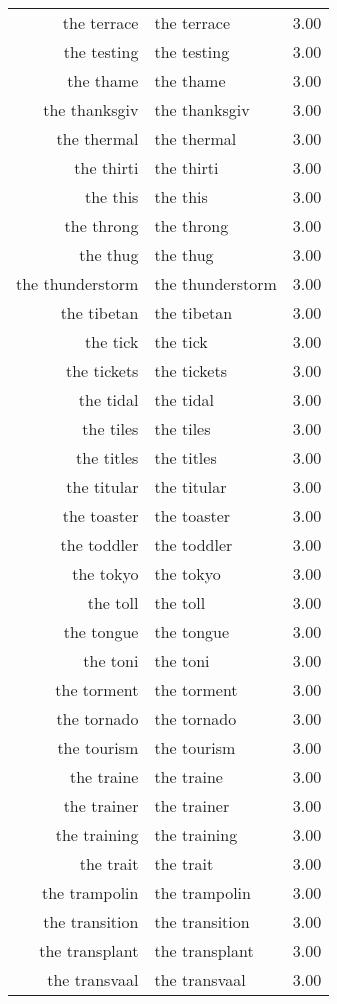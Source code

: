 \begin{table}[ht]
\begin{tabular}{rlr}
  the terrace & the terrace & 3.00 \\ 
  the testing & the testing & 3.00 \\ 
  the thame & the thame & 3.00 \\ 
  the thanksgiv & the thanksgiv & 3.00 \\ 
  the thermal & the thermal & 3.00 \\ 
  the thirti & the thirti & 3.00 \\ 
  the this & the this & 3.00 \\ 
  the throng & the throng & 3.00 \\ 
  the thug & the thug & 3.00 \\ 
  the thunderstorm & the thunderstorm & 3.00 \\ 
  the tibetan & the tibetan & 3.00 \\ 
  the tick & the tick & 3.00 \\ 
  the tickets & the tickets & 3.00 \\ 
  the tidal & the tidal & 3.00 \\ 
  the tiles & the tiles & 3.00 \\ 
  the titles & the titles & 3.00 \\ 
  the titular & the titular & 3.00 \\ 
  the toaster & the toaster & 3.00 \\ 
  the toddler & the toddler & 3.00 \\ 
  the tokyo & the tokyo & 3.00 \\ 
  the toll & the toll & 3.00 \\ 
  the tongue & the tongue & 3.00 \\ 
  the toni & the toni & 3.00 \\ 
  the torment & the torment & 3.00 \\ 
  the tornado & the tornado & 3.00 \\ 
  the tourism & the tourism & 3.00 \\ 
  the traine & the traine & 3.00 \\ 
  the trainer & the trainer & 3.00 \\ 
  the training & the training & 3.00 \\ 
  the trait & the trait & 3.00 \\ 
  the trampolin & the trampolin & 3.00 \\ 
  the transition & the transition & 3.00 \\ 
  the transplant & the transplant & 3.00 \\ 
  the transvaal & the transvaal & 3.00 \\ 

\end{tabular}
\end{table}
